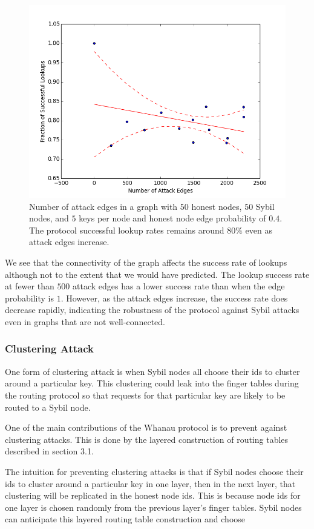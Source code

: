\documentclass[letter]{article}
\begin{document}
\begin{figure}[!h]
\centering
\includegraphics[width=0.9\columnwidth]{4probattackedges}
\caption{Number of attack edges in a graph with $50$ honest nodes, $50$ Sybil nodes, and $5$ keys per node and honest node edge probability of $0.4$. The protocol successful lookup rates remains around $80\%$ even as attack edges increase.}
\label{fig:4probattackedges}
\end{figure}

We see that the connectivity of the graph affects the success rate of lookups although not to the extent that we would have predicted. The lookup success rate at fewer than $500$ attack edges has a lower success rate than when the edge probability is $1$. However, as the attack edges increase, the success rate does decrease rapidly, indicating the robustness of the protocol against Sybil attacks even in graphs that are not well-connected.

\subsubsection{Clustering Attack}

One form of clustering attack is when Sybil nodes all choose their ids to cluster
around a particular key. This clustering could leak into the finger tables during
the routing protocol so that requests for that particular key are likely to be routed to a Sybil node.

One of the main contributions of the Whanau protocol is to prevent against clustering attacks.
This is done by the layered construction of routing tables described in section 3.1.

The intuition for preventing clustering attacks is that if Sybil nodes
choose their ids to cluster around a particular key in one layer, then in
the next layer, that clustering will be replicated in the honest node ids.
This is because node ids for one layer is chosen randomly from the previous layer's finger tables.
Sybil nodes can anticipate this layered routing table construction and choose
\end{document}
